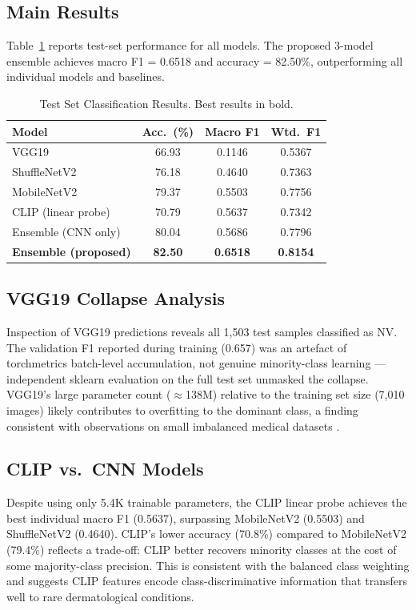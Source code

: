 \documentclass[conference]{IEEEtran}
\begin{document}
\subsection{Main Results}
Table~\ref{tab:results} reports test-set performance for all models.
The proposed 3-model ensemble achieves macro F1 = 0.6518 and accuracy
= 82.50\%, outperforming all individual models and baselines.

\begin{table}[htbp]
\caption{Test Set Classification Results. Best results in bold.}
\label{tab:results}
\centering
\begin{tabular}{lccc}
\toprule
\textbf{Model} & \textbf{Acc.\ (\%)} & \textbf{Macro F1} & \textbf{Wtd.\ F1} \\
\midrule
VGG19                        & 66.93 & 0.1146 & 0.5367 \\
ShuffleNetV2                 & 76.18 & 0.4640 & 0.7363 \\
MobileNetV2                  & 79.37 & 0.5503 & 0.7756 \\
CLIP (linear probe)          & 70.79 & 0.5637 & 0.7342 \\
Ensemble (CNN only)          & 80.04 & 0.5686 & 0.7796 \\
\textbf{Ensemble (proposed)} & \textbf{82.50} & \textbf{0.6518} & \textbf{0.8154} \\
\bottomrule
\end{tabular}
\end{table}

\subsection{VGG19 Collapse Analysis}
Inspection of VGG19 predictions reveals all 1,503 test samples
classified as NV. The validation F1 reported during training (0.657)
was an artefact of torchmetrics batch-level accumulation, not genuine
minority-class learning --- independent sklearn evaluation on the full
test set unmasked the collapse. VGG19's large parameter count
($\approx$138M) relative to the training set size (7,010 images)
likely contributes to overfitting to the dominant class, a finding
consistent with observations on small imbalanced medical datasets
\cite{johnson2019}.

\subsection{CLIP vs.\ CNN Models}
Despite using only 5.4K trainable parameters, the CLIP linear probe
achieves the best individual macro F1 (0.5637), surpassing
MobileNetV2 (0.5503) and ShuffleNetV2 (0.4640). CLIP's lower accuracy
(70.8\%) compared to MobileNetV2 (79.4\%) reflects a trade-off: CLIP
better recovers minority classes at the cost of some majority-class
precision. This is consistent with the balanced class weighting and
suggests CLIP features encode class-discriminative information that
transfers well to rare dermatological conditions.
\end{document}
